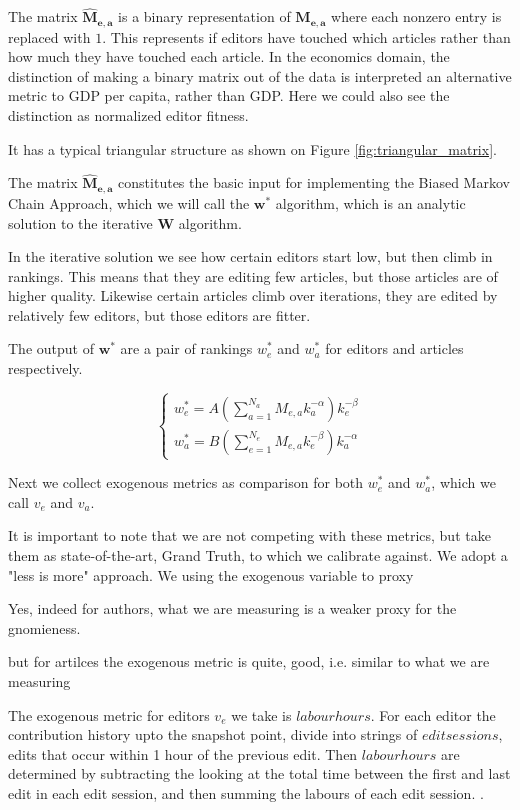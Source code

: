\documentclass{acm_proc_article-sp}
\begin{document}
 
The matrix $\mathbf{\hat{M}_{e,a}}$ is a binary representation of $\mathbf{M_{e,a}}$ where each nonzero entry is replaced with $1$. This represents if editors have touched which articles rather than how much they have touched each article. In the economics domain, the distinction of making a binary matrix out of the data is interpreted an alternative metric to GDP per capita, rather than GDP. Here we could also see the distinction as normalized editor fitness.

It has a typical triangular structure as shown on Figure \ref{fig:triangular_matrix}.

The matrix $\mathbf{\hat{M}_{e,a}}$ constitutes the basic input for implementing the Biased Markov Chain Approach, which we will call the $\mathbf{w^*}$ algorithm, which is an analytic solution to the iterative $\mathbf{W}$ algorithm. \cite{Caldarelli} 

In the iterative solution we see how certain editors start low, but then climb in rankings. This means that they are editing few articles, but those articles are of higher quality. Likewise certain articles climb over iterations, they are edited by relatively few editors, but those editors are fitter.

The output of $\mathbf{w^*}$ are a pair of rankings $ w^*_e$ and $ w^*_a$ for editors and articles respectively.

\begin{equation}
\begin{cases}
w^*_e = A(\sum^{N_a}_{a=1} M_{e,a}k_a^{-\alpha})k_e^{-\beta} \\
w^*_a = B(\sum^{N_e}_{e=1} M_{e,a}k_e^{-\beta})k_a^{-\alpha}
\end{cases}
\end{equation}

Next we collect exogenous metrics as comparison for both  $w^{*}_{e}$ and $w^{*}_{a}$, which we call  $v_e$ and $v_a$.

It is important to note that we are not competing with these metrics, but take them as state-of-the-art, Grand Truth, to which we calibrate against. We adopt a "less is more" approach. We using the exogenous variable to proxy 

Yes, indeed for authors, what we are measuring is a weaker proxy for the gnomieness.

but for artilces the exogenous metric is quite, good, i.e. similar to what we are measuring


The exogenous metric for editors $v_e$ we take is $labour hours$. For each editor the contribution history upto the snapshot point,  divide into strings of $edit sessions$, edits that occur within 1 hour of the previous edit. Then $labour hours$ are determined by subtracting the looking at the total time between the first and last edit in each edit session, and then summing the labours of each edit session. \cite{Geiger, Halfaker}. 
\end{document}
